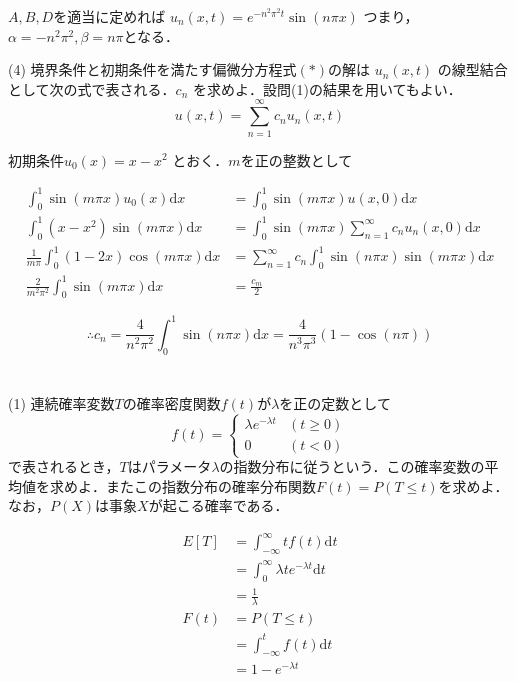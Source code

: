 \documentclass[a4j]{jarticle}
\newcommand{\intd}[1]{
  \mathrm{d} #1
}
\begin{document}
$A,B,D$を適当に定めれば $u_n(x,t) = e^{-n^2\pi^2 t} \sin(n \pi x)$ つまり，$\alpha = -n^2\pi^2, \beta = n \pi$となる．

\begin{screen}
 (4) 境界条件と初期条件を満たす偏微分方程式$(\ast)$の解は $u_n(x,t)$ の線型結合として次の式で表される．$c_n$ を求めよ．設問(1)の結果を用いてもよい．
 $$u(x,t) = \sum_{n=1}^\infty c_n u_n (x,t)$$
\end{screen}

初期条件$u_0 (x) = x-x^2$ とおく．$m$を正の整数として

\begin{align*}
 \int_0^1 \sin(m \pi x)u_0(x) \mathrm{d} x&=  \int_0^1 \sin(m \pi x)u(x,0) \mathrm{d} x \\
 \int_0^1 (x-x^2)\sin(m \pi x) \mathrm{d} x&=  \int_0^1 \sin(m \pi x)\sum_{n=1}^\infty c_n u_n(x,0) \mathrm{d} x \\
 \frac{1}{m\pi} \int_0^1(1-2x)\cos(m \pi x) \mathrm{d}x &= \sum_{n=1}^\infty c_n \int_0^1 \sin(n \pi x) \sin( m \pi x) \mathrm{d} x \\
 \frac{2}{m^2\pi^2}\int_0^1 \sin(m \pi x)\mathrm{d}x&= \frac{c_m}{2}
\end{align*}

$$ \therefore c_n = \frac{4}{n^2\pi^2}\int_0^1 \sin(n \pi x)\mathrm{d}x = \frac{4}{n^3\pi^3}(1-\cos(n \pi))$$

\section{}

\begin{screen}
 (1) 連続確率変数$T$の確率密度関数$f(t)$が$\lambda$を正の定数として
 $$f(t)=\begin{cases}
         \lambda e^{-\lambda t} & (t\geq 0) \\
         0 & (t<0)
        \end{cases}$$
 で表されるとき，$T$はパラメータ$\lambda$の指数分布に従うという．この確率変数の平均値を求めよ．またこの指数分布の確率分布関数$F(t)=P(T \leq t)$を求めよ．なお，$P(X)$は事象$X$が起こる確率である．
\end{screen}

\begin{align*}
 E\left[T\right] &= \int_{-\infty}^{\infty} t f(t) \intd{t} \\
 &= \int_0^\infty \lambda t e^{-\lambda t} \intd{t} \\
 &= \frac{1}{\lambda} \\
 F(t) &= P(T \leq t) \\
 &= \int_{-\infty}^t  f(t) \intd{t} \\
 &= 1  - e^{-\lambda t}
\end{align*}
\end{document}
